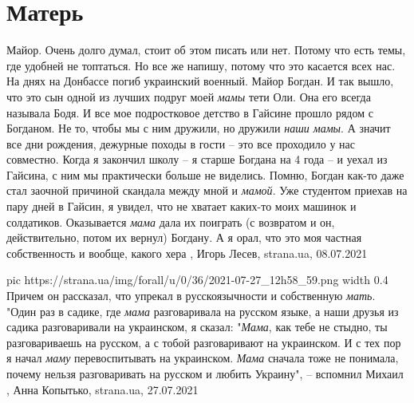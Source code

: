  
 
 
 
 
\chapter{Матерь}
\label{sec:slova.materj}

Майор.
Очень долго думал, стоит об этом писать или нет. Потому что есть темы, где
удобней не топтаться. Но все же напишу, потому что это касается всех нас.
На днях на Донбассе погиб украинский военный. Майор Богдан. И так вышло, что
это сын одной из лучших подруг моей \emph{мамы} тети Оли. Она его всегда называла
Бодя. И все мое подростковое детство в Гайсине прошло рядом с Богданом. Не то,
чтобы мы с ним дружили, но дружили \emph{наши мамы}. А значит все дни рождения,
дежурные походы в гости – это все проходило у нас совместно.
Когда я закончил школу – я старше Богдана на 4 года – и уехал из Гайсина, с ним
мы практически больше не виделись. Помню, Богдан как-то даже стал заочной
причиной скандала между мной и \emph{мамой}. Уже студентом приехав на пару дней в
Гайсин, я увидел, что не хватает каких-то моих машинок и солдатиков.
Оказывается \emph{мама} дала их поиграть (с возвратом и он, действительно, потом их
вернул) Богдану. А я орал, что это моя частная собственность и вообще, какого
хера
, 
Игорь Лесев, strana.ua, 08.07.2021

\ifcmt
  pic https://strana.ua/img/forall/u/0/36/2021-07-27_12h58_59.png
  width 0.4
\fi
Причем он рассказал, что упрекал в русскоязычности и собственную \emph{мать}.
"Один раз в садике, где \emph{мама} разговаривала на русском языке, а наши друзья из
садика разговаривали на украинском, я сказал: "\emph{Мама}, как тебе не стыдно, ты
разговариваешь на русском, а с тобой разговаривают на украинском. И с тех пор я
начал \emph{маму} перевоспитывать на украинском. \emph{Мама} сначала тоже не понимала, почему
нельзя разговаривать на русском и любить Украину", – вспомнил Михаил
, 
Анна Копытько, strana.ua, 27.07.2021

